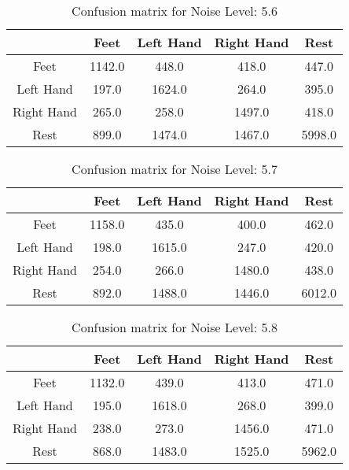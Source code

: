 \begin{table}[!htbp]
    \centering
    \begin{tabular}{|c||c|c|c|c|}
        \hline
		 & Feet & Left Hand & Right Hand & Rest \\
        \hline
        \hline
        Feet & 1142.0 & 448.0 & 418.0 & 447.0 \\
        \hline
        Left Hand & 197.0 & 1624.0 & 264.0 & 395.0 \\
        \hline
        Right Hand & 265.0 & 258.0 & 1497.0 & 418.0 \\
        \hline
        Rest & 899.0 & 1474.0 & 1467.0 & 5998.0 \\
        \hline
    \end{tabular}
    \caption{Confusion matrix for Noise Level: 5.6}
\end{table}

\begin{table}[!htbp]
    \centering
    \begin{tabular}{|c||c|c|c|c|}
        \hline
		 & Feet & Left Hand & Right Hand & Rest \\
        \hline
        \hline
        Feet & 1158.0 & 435.0 & 400.0 & 462.0 \\
        \hline
        Left Hand & 198.0 & 1615.0 & 247.0 & 420.0 \\
        \hline
        Right Hand & 254.0 & 266.0 & 1480.0 & 438.0 \\
        \hline
        Rest & 892.0 & 1488.0 & 1446.0 & 6012.0 \\
        \hline
    \end{tabular}
    \caption{Confusion matrix for Noise Level: 5.7}
\end{table}

\begin{table}[!htbp]
    \centering
    \begin{tabular}{|c||c|c|c|c|}
        \hline
		 & Feet & Left Hand & Right Hand & Rest \\
        \hline
        \hline
        Feet & 1132.0 & 439.0 & 413.0 & 471.0 \\
        \hline
        Left Hand & 195.0 & 1618.0 & 268.0 & 399.0 \\
        \hline
        Right Hand & 238.0 & 273.0 & 1456.0 & 471.0 \\
        \hline
        Rest & 868.0 & 1483.0 & 1525.0 & 5962.0 \\
        \hline
    \end{tabular}
    \caption{Confusion matrix for Noise Level: 5.8}
\end{table}


